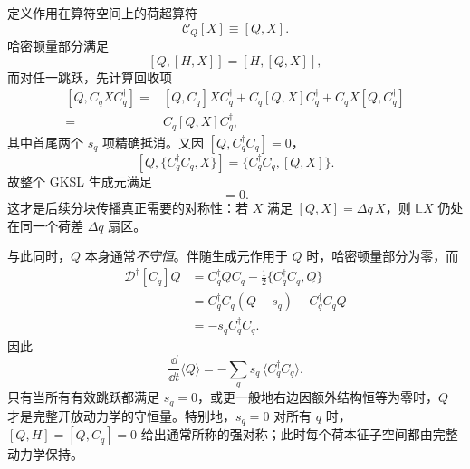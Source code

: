 定义作用在算符空间上的荷超算符
\begin{equation}
\mathcal C_Q[X]\equiv[Q,X].
\label{eq:phys-oqs-charge-superoperator}
\end{equation}
哈密顿量部分满足
\[
[Q,[H,X]]=[H,[Q,X]],
\]
而对任一跳跃，先计算回收项
\[
\begin{aligned}
[Q,C_qXC_q^\dagger]
={}&[Q,C_q]XC_q^\dagger
+C_q[Q,X]C_q^\dagger
+C_qX[Q,C_q^\dagger]\\
={}&C_q[Q,X]C_q^\dagger,
\end{aligned}
\]
其中首尾两个 $s_q$ 项精确抵消。又因 $[Q,C_q^\dagger C_q]=0$，
\[
\left[Q,\{C_q^\dagger C_q,X\}\right]
=\{C_q^\dagger C_q,[Q,X]\}.
\]
故整个 GKSL 生成元满足
\begin{equation}
[\mathcal C_Q,\mathbb L]=0.
\label{eq:phys-oqs-liouvillian-charge-covariance}
\end{equation}
这才是后续分块传播真正需要的对称性：若 $X$ 满足 $[Q,X]=\Delta q\,X$，则 $\mathbb L X$ 仍处在同一个荷差 $\Delta q$ 扇区。

与此同时，$Q$ 本身通常\emph{不守恒}。伴随生成元作用于 $Q$ 时，哈密顿量部分为零，而
\[
\begin{aligned}
\mathcal D^\dagger[C_q]Q
&=C_q^\dagger Q C_q
-\frac12\{C_q^\dagger C_q,Q\}\\
&=C_q^\dagger C_q(Q-s_q)-C_q^\dagger C_qQ\\
&=-s_qC_q^\dagger C_q.
\end{aligned}
\]
因此
\begin{equation}
\frac{\dd}{\dd t}\langle Q\rangle
=-\sum_qs_q\,\langle C_q^\dagger C_q\rangle.
\label{eq:phys-oqs-charge-expectation-flow}
\end{equation}
只有当所有有效跳跃都满足 $s_q=0$，或更一般地右边因额外结构恒等为零时，$Q$ 才是完整开放动力学的守恒量。特别地，$s_q=0$ 对所有 $q$ 时，$[Q,H]=[Q,C_q]=0$ 给出通常所称的强对称；此时每个荷本征子空间都由完整动力学保持。

